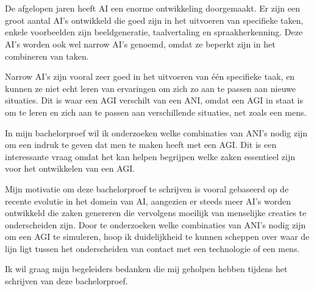
\chapter*{}
\label{ch:voorwoord}


De afgelopen jaren heeft AI een enorme ontwikkeling doorgemaakt. Er zijn een groot aantal AI's ontwikkeld die goed zijn in het uitvoeren van specifieke taken, enkele voorbeelden zijn beeldgeneratie, taalvertaling en spraakherkenning. Deze AI's worden ook wel narrow AI's genoemd, omdat ze beperkt zijn in het combineren van taken.

Narrow AI's zijn vooral zeer goed in het uitvoeren van één specifieke taak, en kunnen ze niet echt leren van ervaringen om zich zo aan te passen aan nieuwe situaties. Dit is waar een AGI verschilt van een ANI, omdat een AGI in staat is om te leren en zich aan te passen aan verschillende situaties, net zoals een mens.

In mijn bachelorproef wil ik onderzoeken welke combinaties van ANI's nodig zijn om een indruk te geven dat men te maken heeft met een AGI. Dit is een interessante vraag omdat het kan helpen begrijpen welke zaken essentieel zijn voor het ontwikkelen van een AGI.

Mijn motivatie om deze bachelorproef te schrijven is vooral gebaseerd op de recente evolutie in het domein van AI, aangezien er steeds meer AI's worden ontwikkeld die zaken genereren die vervolgens moeilijk van menselijke creaties te onderscheiden zijn. Door te onderzoeken welke combinaties van ANI's nodig zijn om een AGI te simuleren, hoop ik duidelijkheid te kunnen scheppen over waar de lijn ligt tussen het onderscheiden van contact met een technologie of een mens.

Ik wil graag mijn begeleiders bedanken die mij geholpen hebben tijdens het schrijven van deze bachelorproef.
